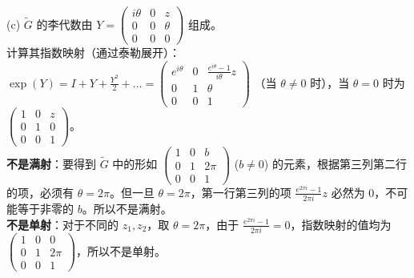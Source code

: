 \documentclass{ctexart}
\begin{document}
(c) $\tilde{G}$ 的李代数由 $Y = \begin{pmatrix} i\theta & 0 & z \\ 0 & 0 & \theta \\ 0 & 0 & 0 \end{pmatrix}$ 组成。\\
计算其指数映射（通过泰勒展开）：\\
$\exp(Y) = I + Y + \frac{Y^2}{2} + \dots = \begin{pmatrix} e^{i\theta} & 0 & \frac{e^{i\theta} - 1}{i\theta} z \\ 0 & 1 & \theta \\ 0 & 0 & 1 \end{pmatrix}$ （当 $\theta \neq 0$ 时），当 $\theta = 0$ 时为 $\begin{pmatrix} 1 & 0 & z \\ 0 & 1 & 0 \\ 0 & 0 & 1 \end{pmatrix}$。\\
\textbf{不是满射}：要得到 $\tilde{G}$ 中的形如 $\begin{pmatrix} 1 & 0 & b \\ 0 & 1 & 2\pi \\ 0 & 0 & 1 \end{pmatrix}$ ($b \neq 0$) 的元素，根据第三列第二行的项，必须有 $\theta = 2\pi$。但一旦 $\theta = 2\pi$，第一行第三列的项 $\frac{e^{2\pi i} - 1}{2\pi i} z$ 必然为 $0$，不可能等于非零的 $b$。所以不是满射。\\
\textbf{不是单射}：对于不同的 $z_1, z_2$，取 $\theta = 2\pi$，由于 $\frac{e^{2\pi i}-1}{2\pi i} = 0$，指数映射的值均为 $\begin{pmatrix} 1 & 0 & 0 \\ 0 & 1 & 2\pi \\ 0 & 0 & 1 \end{pmatrix}$，所以不是单射。
\end{document}

